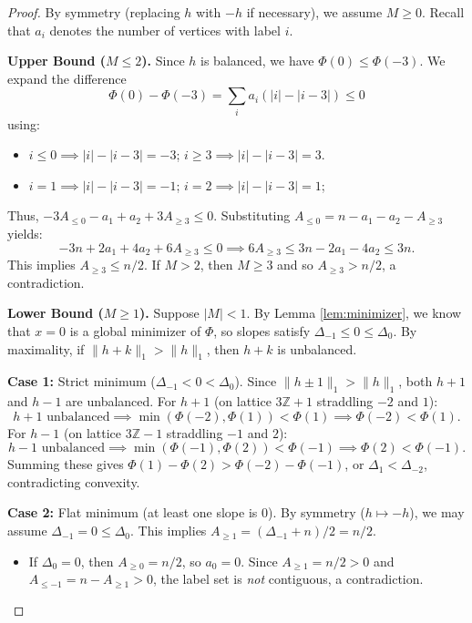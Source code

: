 \documentclass[12pt,reqno]{amsart}
\theoremstyle{definition}
\newcommand{\Z}{\mathbb{Z}}
\begin{document}
\begin{proof} By symmetry (replacing $h$ with $-h$ if necessary), we assume $M \ge 0$. Recall that $a_i$ denotes the number of vertices with label $i$.

\medskip\noindent
\textbf{Upper Bound ($M \le 2$).}
Since $h$ is balanced, we have $\Phi(0) \le \Phi(-3)$. We expand the difference 
\[
\Phi(0) - \Phi(-3) = \sum_{i} a_i (|i| - |i-3|)\leq 0
\]
using:
\begin{itemize}[noitemsep]
    \item $i \le 0 \implies |i| - |i-3| = -3$; \quad $i \ge 3 \implies |i| - |i-3| = 3$.
    \item $i = 1 \implies |i| - |i-3| = -1$; \quad $i = 2 \implies |i| - |i-3| = 1$;
\end{itemize}
Thus, $-3A_{\le 0} - a_1 + a_2 + 3A_{\ge 3} \le 0$. Substituting $A_{\le 0} = n - a_1 - a_2 - A_{\ge 3}$ yields:
\[
-3n + 2a_1 + 4a_2 + 6A_{\ge 3} \le 0 \implies 6A_{\ge 3} \le 3n - 2a_1 - 4a_2 \le 3n.
\]
This implies $A_{\ge 3} \le n/2$. If $M > 2$, then $M \ge 3$ and so $A_{\ge 3} > n/2$, a contradiction.

\medskip\noindent
\textbf{Lower Bound ($M \ge 1$).}
Suppose $|M| < 1$. By Lemma \ref{lem:minimizer}, we know that $x=0$ is a global minimizer of $\Phi$, so slopes satisfy $\Delta_{-1} \le 0 \le \Delta_0$. By maximality, if $\|h+k\|_1 > \|h\|_1$, then $h+k$ is unbalanced.

\smallskip
\textbf{Case 1:} Strict minimum ($\Delta_{-1} < 0 < \Delta_0$).
Since $\|h\pm 1\|_1 > \|h\|_1$, both $h+1$ and $h-1$ are unbalanced.
For $h+1$ (on lattice $3\Z+1$ straddling $-2$ and $1$):
\[
\text{$h+1$ unbalanced} \implies \min(\Phi(-2), \Phi(1)) < \Phi(1) \implies \Phi(-2) < \Phi(1).
\]
For $h-1$ (on lattice $3\Z-1$ straddling $-1$ and $2$):
\[
\text{$h-1$ unbalanced} \implies \min(\Phi(-1), \Phi(2)) < \Phi(-1) \implies \Phi(2) < \Phi(-1).
\]
Summing these gives $\Phi(1) - \Phi(2) > \Phi(-2) - \Phi(-1)$, or $\Delta_1 < \Delta_{-2}$, contradicting convexity.

\smallskip
\textbf{Case 2:} Flat minimum (at least one slope is 0).
By symmetry ($h \mapsto -h$), we may assume $\Delta_{-1} = 0 \le \Delta_0$. This implies $A_{\ge 1} = (\Delta_{-1}+n)/2 = n/2$.
\begin{itemize}
    \item If $\Delta_0 = 0$, then $A_{\ge 0} = n/2$, so $a_0 = 0$. Since $A_{\ge 1} = n/2 > 0$ and $A_{\le -1} = n-A_{\geq 1} > 0$, the label set is \emph{not} contiguous, a contradiction.
    

\end{itemize}
\end{proof}
\end{document}

